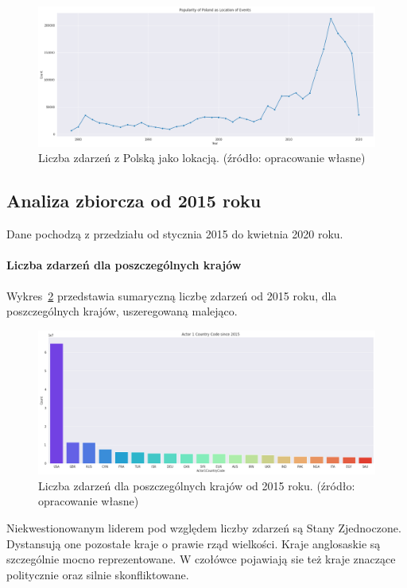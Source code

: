 \documentclass[11pt]{report}
\begin{document}
    \begin{figure}[!htp]
        \centering
        \includegraphics[width=\linewidth]{fig/PL/PLlocation.png}
        \caption{Liczba zdarzeń z Polską jako lokacją. (źródło: opracowanie własne)}
        \label{fig:PLlocation}
    \end{figure}

    \subsection{Analiza zbiorcza od 2015 roku}
    Dane pochodzą z przedziału od stycznia 2015 do kwietnia 2020 roku.

    \paragraph{Liczba zdarzeń dla poszczególnych krajów}
    Wykres~\ref{fig:GLOBALactor1} przedstawia sumaryczną liczbę zdarzeń od 2015 roku, dla poszczególnych krajów, uszeregowaną malejąco.
    \begin{figure}[!htp]
        \centering
        \includegraphics[width=\linewidth]{fig/GLOBAL/Actor1.png}
        \caption{Liczba zdarzeń dla poszczególnych krajów od 2015 roku. (źródło: opracowanie własne)}
        \label{fig:GLOBALactor1}
    \end{figure}
    Niekwestionowanym liderem pod względem liczby zdarzeń są Stany Zjednoczone. Dystansują one pozostałe kraje o prawie rząd wielkości.
    Kraje anglosaskie są szczególnie mocno reprezentowane.
    W czołówce pojawiają sie też kraje znaczące politycznie oraz silnie skonfliktowane.
\end{document}
